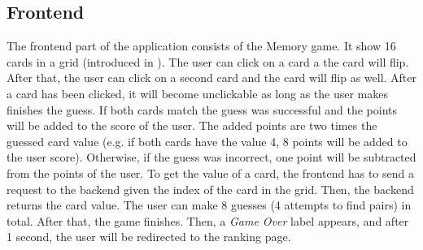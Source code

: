 \subsection{Frontend}\label{subsec:02_design_frontend}
The frontend part of the application consists of the Memory game.
It show 16 cards in a grid (introduced in ). The user can click on a card a the card will flip. After that, the user can click on a second card and the card will flip as well. After a card has been clicked, it will become unclickable as long as the user makes finishes the guess.
If both cards match the guess was successful and the points will be added to the score of the user. The added points are two times the guessed card value (e.g. if both cards have the value 4, 8 points will be added to the user score). Otherwise, if the guess was incorrect, one point will be subtracted from the points of the user.
To get the value of a card, the frontend has to send a request to the backend given the index of the card in the grid. Then, the backend returns the card value.
The user can make 8 guesses (4 attempts to find pairs) in total. After that, the game finishes. Then, a \textit{Game Over} label appears, and after 1 second, the user will be redirected to the ranking page.

